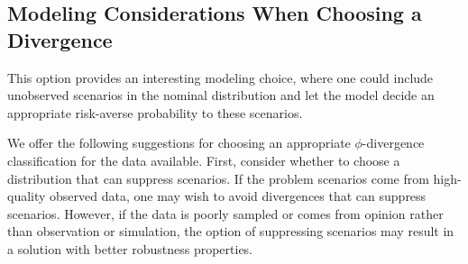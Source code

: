 \documentclass[opre,nonblindrev]{informs3} %
\newcommand{\p}{\mathbf{p}}
\begin{document}

\subsection{Modeling Considerations When Choosing a Divergence}
\label{ssec:modeling}

\bigskip 


 
This option provides an interesting modeling choice, where one could include unobserved scenarios in the nominal distribution and let the model decide an appropriate risk-averse probability to these scenarios. 



\bigskip 




We offer the following suggestions for choosing an appropriate $\phi$-divergence classification for the data available.
First, consider whether to choose a distribution that can suppress scenarios.
If the problem scenarios come from high-quality observed data, one may wish to avoid divergences that can suppress scenarios.
However, if the data is poorly sampled or comes from opinion rather than observation or simulation, the option of suppressing scenarios may result in a solution with better robustness properties.
\end{document}
